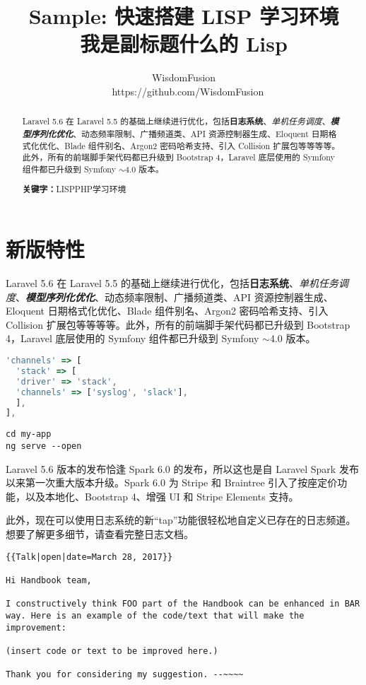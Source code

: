 \documentclass{progartcn}
\title{\bfseries\sffamily
  Sample: 快速搭建 LISP 学习环境\\
  \normalfont\zihao{-3}
  我是副标题什么的 Lisp
}
\author{WisdomFusion \\ \faGithubAlt~ https://github.com/WisdomFusion}
\date{}
\begin{document}
\maketitle
\thispagestyle{empty}


\begin{abstract}
\noindent Laravel 5.6 在 Laravel 5.5 的基础上继续进行优化，包括\textbf{日志系统}、\textit{单机任务调度}、\textbf{\textit{模型序列化优化}}、动态频率限制、广播频道类、API 资源控制器生成、Eloquent 日期格式化优化、Blade 组件别名、Argon2 密码哈希支持、引入 Collision 扩展包等等等等。此外，所有的前端脚手架代码都已升级到 Bootstrap 4，Laravel 底层使用的 Symfony 组件都已升级到 Symfony $\sim$4.0 版本。

\vspace{2ex}
\noindent \textbf{关键字：}LISP\quad{}PHP\quad{}学习环境
\end{abstract}

\section{新版特性}
\label{newfeatures}

Laravel 5.6 在 Laravel 5.5 的基础上继续进行优化，包括\textbf{日志系统}、\textit{单机任务调度}、\textbf{\textit{模型序列化优化}}、动态频率限制、广播频道类、API 资源控制器生成、Eloquent 日期格式化优化、Blade 组件别名、Argon2 密码哈希支持、引入 Collision 扩展包等等等等。此外，所有的前端脚手架代码都已升级到 Bootstrap 4，Laravel 底层使用的 Symfony 组件都已升级到 Symfony $\sim$4.0 版本。

\begin{lstlisting}[language=JavaScript,caption={test/test.json}]
'channels' => [
  'stack' => [
  'driver' => 'stack',
  'channels' => ['syslog', 'slack'],
  ],
],
\end{lstlisting}


\begin{lstlisting}[style=bashstyle]
cd my-app
ng serve --open
\end{lstlisting}

Laravel 5.6 版本的发布恰逢 Spark 6.0 的发布，所以这也是自 Laravel Spark 发布以来第一次重大版本升级。Spark 6.0 为 Stripe 和 Braintree 引入了按座定价功能，以及本地化、Bootstrap 4、增强 UI 和 Stripe Elements 支持。

此外，现在可以使用日志系统的新``tap''功能很轻松地自定义已存在的日志频道。想要了解更多细节，请查看完整日志文档。

\begin{lstlisting}[style=bashoutstyle]
{{Talk|open|date=March 28, 2017}}

Hi Handbook team,

I constructively think FOO part of the Handbook can be enhanced in BAR way. Here is an example of the code/text that will make the improvement:

(insert code or text to be improved here.)

Thank you for considering my suggestion. --~~~~
\end{lstlisting}
\end{document}
